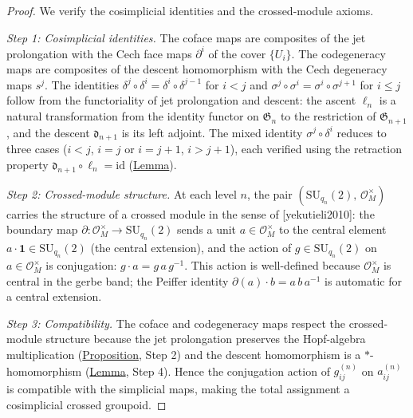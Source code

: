 \begin{proof}
We verify the cosimplicial identities and the crossed-module axioms.

\emph{Step 1: Cosimplicial identities.}
The coface maps are composites of the jet prolongation with the
Cech face maps $\partial^i$ of the cover $\{U_i\}$.  The
codegeneracy maps are composites of the descent homomorphism with the
Cech degeneracy maps $s^j$.  The identities
$\delta^j \circ \delta^i = \delta^i \circ \delta^{j-1}$ for $i < j$
and $\sigma^j \circ \sigma^i = \sigma^i \circ \sigma^{j+1}$ for $i \leq j$
follow from the functoriality of jet prolongation and descent: the ascent
$\ell_n$ is a natural transformation from the identity functor on
$\mathfrak{G}_n$ to the restriction of $\mathfrak{G}_{n+1}$, and the
descent $\mathfrak{d}_{n+1}$ is its left adjoint.  The mixed identity
$\sigma^j \circ \delta^i$ reduces to three cases
($i < j$, $i = j$ or $i = j + 1$, $i > j + 1$), each verified using
the retraction property $\mathfrak{d}_{n+1} \circ \ell_n = \mathrm{id}$
(\hyperref[lem:descent]{Lemma}).

\emph{Step 2: Crossed-module structure.}
At each level $n$, the pair
$(\mathrm{SU}_{q_n}(2),\, \mathcal{O}_M^{\times})$ carries the structure
of a crossed module in the sense of [yekutieli2010]: the boundary
map $\partial \colon \mathcal{O}_M^{\times} \to \mathrm{SU}_{q_n}(2)$
sends a unit $a \in \mathcal{O}_M^{\times}$ to the central element
$a \cdot \mathbf{1} \in \mathrm{SU}_{q_n}(2)$ (the central extension),
and the action of $g \in \mathrm{SU}_{q_n}(2)$ on
$a \in \mathcal{O}_M^{\times}$ is conjugation:
$g \cdot a = g\, a\, g^{-1}$.  This action is well-defined because
$\mathcal{O}_M^{\times}$ is central in the gerbe band; the Peiffer
identity $\partial(a) \cdot b = a\, b\, a^{-1}$ is automatic for a
central extension.

\emph{Step 3: Compatibility.}
The coface and codegeneracy maps respect the crossed-module structure
because the jet prolongation preserves the Hopf-algebra multiplication
(\hyperref[prop:jet-prolongation]{Proposition}, Step 2) and the descent
homomorphism is a $*$-homomorphism (\hyperref[lem:descent]{Lemma}, Step 4).
Hence the conjugation action of $g_{ij}^{(n)}$ on $a_{ij}^{(n)}$ is
compatible with the simplicial maps, making the total assignment a
cosimplicial crossed groupoid.
\end{proof}

